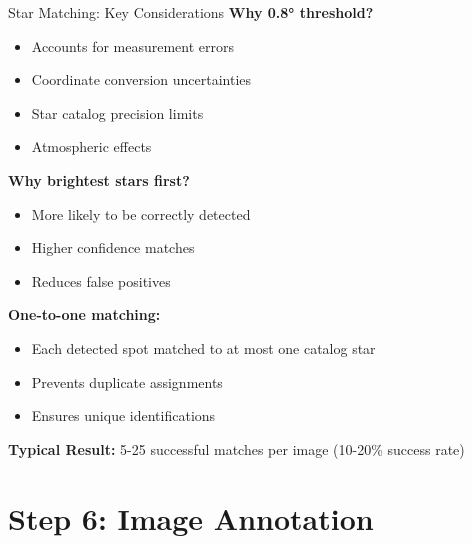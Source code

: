 \documentclass[aspectratio=169]{beamer}
\begin{document}
\begin{frame}{Star Matching: Key Considerations}
\textbf{Why 0.8° threshold?}
\begin{itemize}
\item Accounts for measurement errors
\item Coordinate conversion uncertainties  
\item Star catalog precision limits
\item Atmospheric effects
\end{itemize}

\textbf{Why brightest stars first?}
\begin{itemize}
\item More likely to be correctly detected
\item Higher confidence matches
\item Reduces false positives
\end{itemize}

\textbf{One-to-one matching:}
\begin{itemize}
\item Each detected spot matched to at most one catalog star
\item Prevents duplicate assignments
\item Ensures unique identifications
\end{itemize}

\textcolor{stargreen}{\textbf{Typical Result:} 5-25 successful matches per image (10-20\% success rate)}
\end{frame}

\section{Step 6: Image Annotation}
\end{document}

